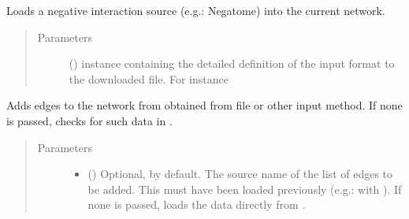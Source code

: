 \documentclass[letterpaper,10pt,english]{sphinxmanual}
\begin{document}
\begin{fulllineitems}
\begin{fulllineitems}
\begin{quote}
\begin{description}
\begin{itemize}
\end{itemize}

\end{description}\end{quote}

\end{fulllineitems}


\begin{fulllineitems}
\label{\detokenize{main:pypath.main.PyPath.apply_negative}}
Loads a negative interaction source (e.g.: Negatome) into the
current network.
\begin{quote}\begin{description}
\item[{Parameters}] \leavevmode
{} () \textendash{}  instance
containing the detailed definition of the input format to
the downloaded file. For instance

\end{description}\end{quote}

\end{fulllineitems}


\begin{fulllineitems}
\label{\detokenize{main:pypath.main.PyPath.attach_network}}
Adds edges to the network from  obtained from file or
other input method. If none is passed, checks for such data in
.
\begin{quote}\begin{description}
\item[{Parameters}] \leavevmode\begin{itemize}
\item {} 
 () \textendash{} Optional,  by default. The source name of the list
of edges to be added. This must have been loaded previously
(e.g.: with {\hyperref[\detokenize{main:pypath.main.PyPath.read_data_file}]{}}).
If none is passed, loads the data directly from
.


\end{itemize}
\end{description}
\end{quote}
\end{fulllineitems}
\end{fulllineitems}
\end{document}
